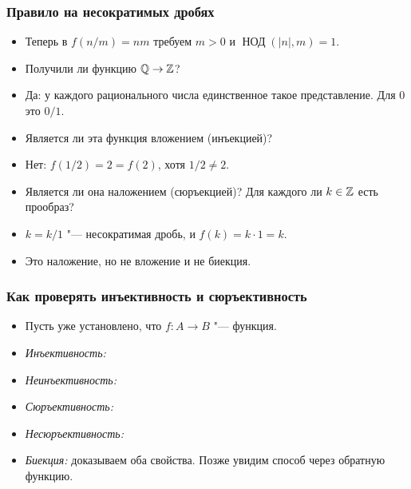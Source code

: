 \documentclass[10pt]{beamer}
\begin{document}
\begin{frame}
    \frametitle{Правило на несократимых дробях}
    \begin{itemize}
        \item Теперь в $f(n/m)=nm$ требуем $m>0$ и $\operatorname{\text{НОД}}(|n|,m)=1$.
        \item Получили ли функцию $\mathbb{Q}\to\mathbb{Z}$?
        \item<2-> Да: у каждого рационального числа единственное такое представление. Для $0$ это $0/1$.
        \item<3-> Является ли эта функция вложением (инъекцией)?
        \item<4-> Нет: $f(1/2)=2=f(2)$, хотя $1/2\neq2$.
        \item<5-> Является ли она наложением (сюръекцией)? Для каждого ли $k\in\mathbb{Z}$ есть прообраз?
        \item<6-> $k=k/1$ "--- несократимая дробь, и $f(k)=k\cdot1=k$.
        \item<7-> Это наложение, но не вложение и не биекция.
    \end{itemize}
\end{frame}

\begin{frame}
    \frametitle{Как проверять инъективность и сюръективность}
    \begin{itemize}
        \item Пусть уже установлено, что $f:A\to B$ "--- функция.
        \item<2-> \emph{Инъективность:}
        \item<4-> \emph{Неинъективность:}
        \item<6-> \emph{Сюръективность:}
        \item<8-> \emph{Несюръективность:}
        \item<10-> \emph{Биекция:} доказываем оба свойства. Позже увидим способ через обратную функцию.
    \end{itemize}
\end{frame}
\end{document}
